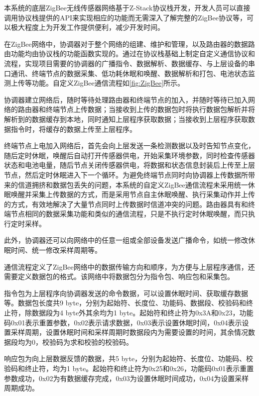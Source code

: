 本系统的底层ZigBee无线传感器网络基于Z-Stack协议栈开发，开发人员可以直接调用协议栈提供的API来实现相应的功能而无需深入了解完整的ZigBee协议等，可以极大程度上为开发工作提供便利，减少开发时间。
\begin{figure}[!htp]
    \centering
    \resizebox{6cm}{!}{}
\end{figure}
在ZigBee网络中，协调器对于整个网络的组建、维护和管理，以及路由器的数据路由功能均由协议栈的功能函数实现的。通过在协议栈基础上制定自定义通信协议和流程，实现项目需要的协调器的广播指令、数据解析、数据缓存、与上层设备的串口通讯、终端节点的数据采集、低功耗休眠和唤醒、数据解析和打包、电池状态监测上传等功能。自定义ZigBee通信流程如\ref{fig:ZigBee}所示。

协调器建立网络后，随时等待处理路由器和终端节点的加入，并随时等待已加入网络的路由器和终端节点上传数据；当接收到上传的数据包时将执行数据包解析并将解析到的数据缓存到本地，同时通知上层程序获取数据；当接收到上层程序获取数据指令时，将缓存的数据上传至上层程序。

终端节点上电加入网络后，首先会向上层发送一条检测数据以及时告知节点变化，随后定时休眠，唤醒后自动打开传感器供电，开始采集环境参数，同时检查传感器状态和电池电量，随后节点关闭传感器供电，将数据和状态信息封装后上传至上层节点，然后定时休眠进入下一个循环。为避免终端节点同时向协调器上传数据所带来的信道拥挤和数据包丢失的问题，本系统的自定义ZigBee通信流程未采用统一休眠唤醒并采集上传数据的方式，而是采用节点自主休眠唤醒、执行采集动作并上传的方式，有效地解决了大量节点同时上传数据时信道冲突的问题。路由器具有和终端节点相同的数据采集功能和类似的通信流程，只是不执行定时休眠唤醒，而只执行定时采样。

此外，协调器还可以向网络中的任意一组或全部设备发送广播命令，如统一修改休眠时间、统一修改采样周期等。

通信流程定义了ZigBee网络中的数据传输方向和顺序，为方便与上层程序通信，还需要定义数据包的格式。该网络中将数据包分为指令包、响应包和采集包。

指令包为上层程序向协调器发送的命令数据，可以设置休眠时间、获取缓存数据等。数据包长度共9 byte，分别为起始符、长度位、功能码、数据段、校验码和终止符，除数据段为4 byte外其余均为1 byte。起始符和终止符为0x3A和0x23，功能码0x01表示重置参数，0x02表示请求数据，0x03表示设置休眠时间，0x04表示设置采样周期，设置休眠时间和采样周期时数据段内为需要设置的时间，其余情况数据段均为0，校验码为求和校验的校验码。

响应包为向上层数据反馈的数据，共5 byte，分别为起始符、长度位、功能码、校验码和终止符，均为1 byte。起始符和终止符为0x25和0x26，功能码0x01表示重置参数成功，0x02为有数据缓存完成，0x03为设置休眠时间成功，0x04为设置采样周期成功。

